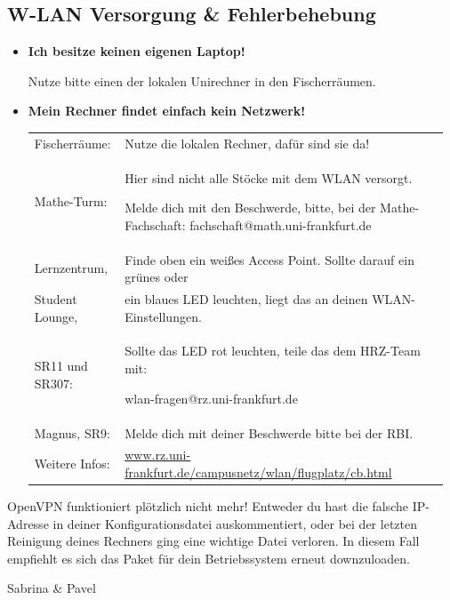 \subsection*{W-LAN Versorgung \& Fehlerbehebung}

\begin{itemize}
	\item \textbf{Ich besitze keinen eigenen Laptop!}

	Nutze bitte einen der lokalen Unirechner in den Fischerräumen.
	
	\item \textbf{Mein Rechner findet einfach kein Netzwerk!}

	\begin{tabular}{p{0.2\linewidth}p{0.77\linewidth}}
\rule{0pt}{2ex} 
	Fischerräume: & Nutze die lokalen Rechner, dafür sind sie da!\\
\rule{0pt}{4ex} 
	Mathe-Turm: & Hier sind nicht alle Stöcke mit dem WLAN versorgt.

	Melde dich mit den Beschwerde, bitte, bei der Mathe-Fachschaft: fachschaft@math.uni-frankfurt.de\\
\rule{0pt}{4ex} 
	Lernzentrum, &  Finde oben ein weißes Access Point.  Sollte darauf ein grünes oder\\
\rule{0pt}{0ex} 
	Student Lounge, & ein blaues LED leuchten, liegt das an deinen WLAN-Einstellungen.\\
\rule{0pt}{0ex} 
	SR11 und SR307: & Sollte das LED rot leuchten, teile das dem HRZ-Team mit:

	wlan-fragen@rz.uni-frankfurt.de\\
\rule{0pt}{4ex} 
	Magnus, SR9: & Melde dich mit deiner Beschwerde bitte bei der RBI.\\
\rule{0pt}{4ex} 
	Weitere Infos: & \url{www.rz.uni-frankfurt.de/campusnetz/wlan/flugplatz/cb.html}
	\end{tabular}
\end{itemize}

\begin{fancyblock}{OpenVPN funktioniert plötzlich nicht mehr!}
Entweder du hast die falsche IP-Adresse in deiner Konfigurationsdatei auskommentiert,
oder bei der letzten Reinigung deines Rechners ging eine wichtige Datei verloren.
In diesem Fall empfiehlt es sich das Paket für dein Betriebssystem erneut downzuloaden.
\end{fancyblock}

\begin{flushright}Sabrina \& Pavel \end{flushright}

